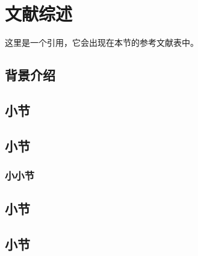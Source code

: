 \section{文献综述}

这里是一个引用\citep{exampleReference}，它会出现在本节的参考文献表中。
\subsection{背景介绍}


\subsection{小节}
\lipsum[3]

\subsection{小节}
\lipsum[4]

\subsubsection{小小节}
\lipsum[4]

\lipsum[4]


\subsection{小节}
\lipsum[7]

\subsection{小节}
\lipsum[8]


